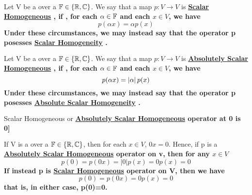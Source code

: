 \label{def:scalarhomogeneous}
\newcommand{\ScalarHomogeneous}[0]{
    \bf \hyperref[def:scalarhomogeneous]{Scalar Homogeneous} \rm
}

\newcommand{\ScalarHomogeneity}[0]{
    \bf \hyperref[def:scalarhomogeneous]{Scalar Homogeneity} \rm
}
\begin{df}
    Let V be a 
	\VectorSpace over a 
	\Field	$\mathbb{F} \in \{\mathbb{R}, \mathbb{C}\}$. 
    We say that a map $p:V \to V$ is \ScalarHomogeneous, if
    , for each $\alpha \in \mathbb{F}$ and each $x \in V$, we have 
    \begin{equation}
        p(\alpha x) = \alpha p(x)
    \end{equation}
    Under these circumstances, we may instead say that the operator 
    p posesses \ScalarHomogeneity.
\end{df}

\label{def:absolutevaluescalarhomogeneous}
\newcommand{\AbsScalarHomogeneous}[0]{
    \bf \hyperref[def:absolutevaluescalarhomogeneous]{Absolutely Scalar Homogeneous} \rm
}

\newcommand{\AbsScalarHomogeneity}[0]{
    \bf \hyperref[def:absolutevaluescalarhomogeneous]{Absolute Scalar Homogeneity} \rm
}
\begin{df}
    Let V be a \VectorSpace over a \Field $\mathbb{F} \in \{\mathbb{R}, \mathbb{C}\}$. 
    We say that a map $p:V \to V$ is \AbsScalarHomogeneous, if
    , for each $\alpha \in \mathbb{F}$ and each $x \in V$, we have 
    \begin{equation}
        p(\alpha x) = \left| \alpha \right| p(x)
    \end{equation}
    Under these circumstances, we may instead say that the operator 
    p posesses \AbsScalarHomogeneity.
\end{df}


\label{rmk:seminorm}
\begin{rmk}[\ScalarHomogeneous or \AbsScalarHomogeneous operator at 0 is 0]

If V is a 
\VectorSpace over a 
\Field 
$\mathbb{F} \in \{\mathbb{R}, \mathbb{C}\}$, then for each 
$x \in V$,
 $0x=0$.
Hence, if p is a \AbsScalarHomogeneous operator on v, then for any $x \in V$
\begin{equation}
p(0)=p(0x)=|0|p(x)=0p(x)=0
\end{equation}
If instead p is \ScalarHomogeneous operator on V, then we have
\begin{equation}
p(0)=p(0x)=0p(x)=0
\end{equation}
that is, in either case,  p(0)=0. 
\end{rmk}




